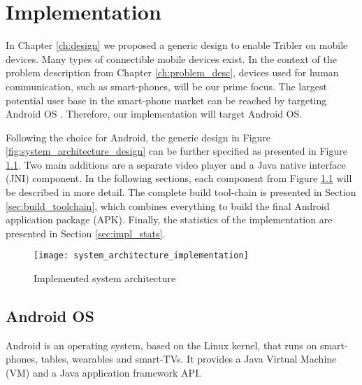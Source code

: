 \chapter{Implementation}\label{ch:implementation}

In Chapter \ref{ch:design} we proposed a generic design to enable Tribler on mobile devices.
Many types of connectible mobile devices exist.
In the context of the problem description from Chapter \ref{ch:problem_desc}, devices used for human communication, such as smart-phones, will be our prime focus.
The largest potential user base in the smart-phone market can be reached by targeting Android OS \cite{smartphone-os}.
Therefore, our implementation will target Android OS.

Following the choice for Android, the generic design in Figure \ref{fig:system_architecture_design} can be further specified as presented in Figure \ref{fig:system_architecture_implementation}.
Two main additions are a separate video player and a Java native interface (JNI) component.
In the following sections, each component from Figure \ref{fig:system_architecture_implementation} will be described in more detail.
The complete build tool-chain is presented in Section \ref{sec:build_toolchain}, which combines everything to build the final Android application package (APK).
Finally, the statistics of the implementation are presented in Section \ref{sec:impl_stats}.

\begin{figure}[H]
	\centering
	\texttt{[image: system\_architecture\_implementation]}
	\caption{Implemented system architecture}
	\label{fig:system_architecture_implementation}
\end{figure}


\section{Android OS}
Android is an operating system, based on the Linux kernel, that runs on smart-phones, tables, wearables and smart-TVs.
It provides a Java Virtual Machine (VM) and a Java application framework API.


